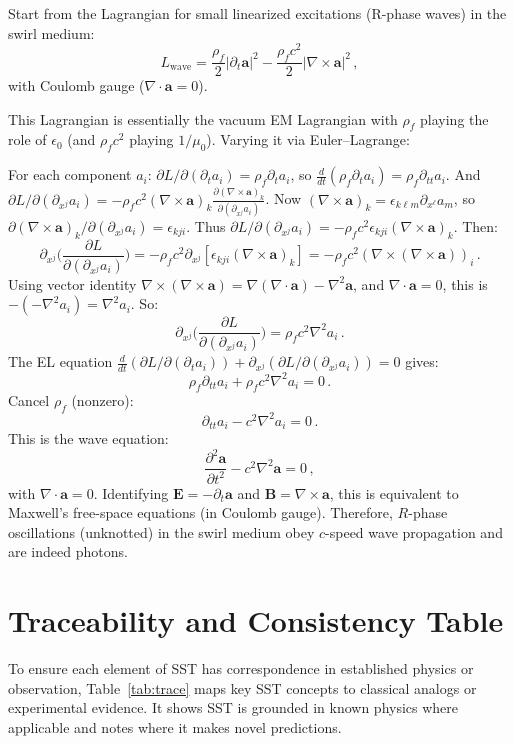 \documentclass[reprint,aps,onecolumn,nofootinbib]{revtex4-2}
\begin{document}
	Start from the Lagrangian for small linearized excitations (R-phase waves) in the swirl medium:
	\[
		L_{\text{wave}} = \frac{\rho_f}{2}|\partial_t \mathbf{a}|^2 - \frac{\rho_f c^2}{2}|\nabla \times \mathbf{a}|^2\,,
	\]
	with Coulomb gauge ($\nabla \cdot \mathbf{a}=0$).

	This Lagrangian is essentially the vacuum EM Lagrangian with $\rho_f$ playing the role of $\epsilon_0$ (and $\rho_f c^2$ playing $1/\mu_0$). Varying it via Euler–Lagrange:

	For each component $a_i$: $\partial L/\partial(\partial_t a_i) = \rho_f \partial_t a_i$, so $\frac{d}{dt}(\rho_f \partial_t a_i) = \rho_f \partial_{tt} a_i$. And $\partial L/\partial(\partial_{x^j} a_i) = -\rho_f c^2 (\nabla \times \mathbf{a})_k \frac{\partial (\nabla \times \mathbf{a})_k}{\partial(\partial_{x^j}a_i)}$. Now $(\nabla \times \mathbf{a})_k = \epsilon_{k\ell m}\partial_{x^\ell} a_m$, so $\partial(\nabla \times \mathbf{a})_k/\partial(\partial_{x^j}a_i) = \epsilon_{kji}$. Thus $\partial L/\partial(\partial_{x^j} a_i) = -\rho_f c^2 \epsilon_{kji}(\nabla \times \mathbf{a})_k$. Then:
	\[
		\partial_{x^j}\Big(\frac{\partial L}{\partial(\partial_{x^j} a_i)}\Big) = -\rho_f c^2 \partial_{x^j}[\epsilon_{kji}(\nabla \times \mathbf{a})_k] = -\rho_f c^2 (\nabla \times (\nabla \times \mathbf{a}))_i\,.
	\]
	Using vector identity $\nabla \times (\nabla \times \mathbf{a}) = \nabla(\nabla\cdot\mathbf{a}) - \nabla^2 \mathbf{a}$, and $\nabla\cdot\mathbf{a}=0$, this is $-(-\nabla^2 a_i) = \nabla^2 a_i$. So:
	\[
		\partial_{x^j}\Big(\frac{\partial L}{\partial(\partial_{x^j} a_i)}\Big) = \rho_f c^2 \nabla^2 a_i\,.
	\]
	The EL equation $\frac{d}{dt}(\partial L/\partial(\partial_t a_i)) + \partial_{x^j}(\partial L/\partial(\partial_{x^j}a_i))=0$ gives:
	\[
		\rho_f \partial_{tt} a_i + \rho_f c^2 \nabla^2 a_i = 0\,.
	\]
	Cancel $\rho_f$ (nonzero):
	\[
		\partial_{tt} a_i - c^2 \nabla^2 a_i = 0\,.
	\]
	This is the wave equation:
	\[
		\frac{\partial^2 \mathbf{a}}{\partial t^2} - c^2 \nabla^2 \mathbf{a} = 0\,,
	\]
	with $\nabla\cdot\mathbf{a}=0$. Identifying $\mathbf{E} = -\partial_t \mathbf{a}$ and $\mathbf{B}=\nabla\times\mathbf{a}$, this is equivalent to Maxwell’s free-space equations (in Coulomb gauge). Therefore, $R$-phase oscillations (unknotted) in the swirl medium obey $c$-speed wave propagation and are indeed photons.

	\section{Traceability and Consistency Table}
	To ensure each element of SST has correspondence in established physics or observation, Table~\ref{tab:trace} maps key SST concepts to classical analogs or experimental evidence. It shows SST is grounded in known physics where applicable and notes where it makes novel predictions.
\end{document}
